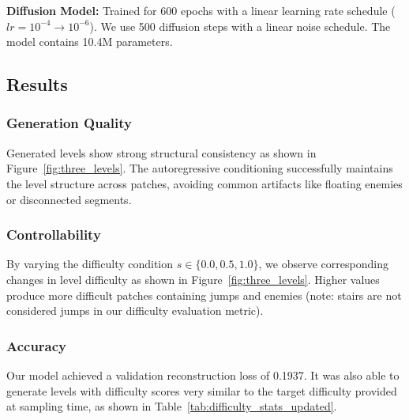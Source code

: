 \documentclass[conference]{IEEEtran}
\begin{document}
\textbf{Diffusion Model:} Trained for 600 epochs with a linear learning rate schedule ($lr=10^{-4} \to 10^{-6}$). We use 500 diffusion steps with a linear noise schedule. The model contains 10.4M parameters.

\subsection{Results}

\subsubsection{Generation Quality}
Generated levels show strong structural consistency as shown in Figure~\ref{fig:three_levels}. The autoregressive conditioning successfully maintains the level structure across patches, avoiding common artifacts like floating enemies or disconnected segments.

\subsubsection{Controllability}
By varying the difficulty condition $s \in \{0.0, 0.5, 1.0\}$, we observe corresponding changes in level difficulty as shown in Figure~\ref{fig:three_levels}. Higher values produce more difficult patches containing jumps and enemies (note: stairs are not considered jumps in our difficulty evaluation metric).

\subsubsection{Accuracy}
Our model achieved a validation reconstruction loss of 0.1937. It was also able to generate levels with difficulty scores very similar to the target difficulty provided at sampling time, as shown in Table~\ref{tab:difficulty_stats_updated}.
\end{document}
